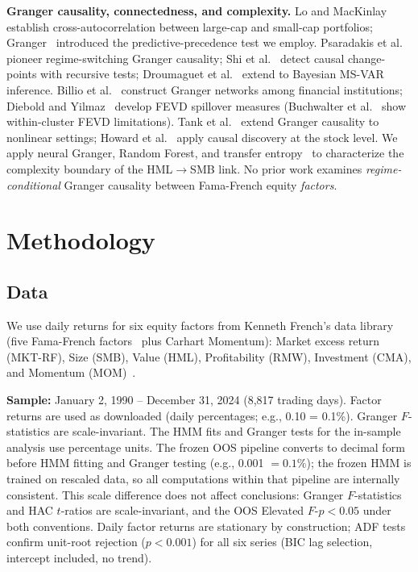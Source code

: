 \documentclass[sigconf,anonymous]{acmart}
\begin{document}
\textbf{Granger causality, connectedness, and complexity.}
Lo and MacKinlay~\cite{lo1990contrarian} establish cross-autocorrelation
between large-cap and small-cap portfolios; Granger~\cite{granger1969investigating}
introduced the predictive-precedence test we employ.
Psaradakis et al.~\cite{psaradakis2005markov} pioneer regime-switching Granger causality;
Shi et al.~\cite{shi2018change,shi2020causal} detect causal change-points with recursive tests;
Droumaguet et al.~\cite{droumaguet2017granger} extend to Bayesian MS-VAR inference.
Billio et al.~\cite{billio2012econometric} construct Granger networks among financial
institutions; Diebold and Yilmaz~\cite{diebold2012better} develop FEVD spillover measures
(Buchwalter et al.~\cite{buchwalter2025clustered} show within-cluster FEVD limitations).
Tank et al.~\cite{tank2022neural} extend Granger causality to nonlinear settings;
Howard et al.~\cite{howard2025causal} apply causal discovery at the stock level.
We apply neural Granger, Random Forest, and transfer
entropy~\cite{schreiber2000measuring,marschinski2002analysing,frenzel2007partial,barnett2009granger}
to characterize the complexity boundary of the HML$\to$SMB link.
No prior work examines \emph{regime-conditional} Granger causality
between Fama-French equity \emph{factors}.

\section{Methodology}

\subsection{Data}

We use daily returns for six equity factors from Kenneth French's data library~\cite{french2024data} (five Fama-French factors~\cite{fama2015five} plus Carhart Momentum):
Market excess return (MKT-RF), Size (SMB), Value (HML), Profitability (RMW),
Investment (CMA), and Momentum (MOM)~\cite{jegadeesh1993returns,carhart1997persistence}.

\textbf{Sample:} January 2, 1990 -- December 31, 2024 (8,817 trading days).
Factor returns are used as downloaded (daily percentages; e.g., 0.10 = 0.1\%).
Granger $F$-statistics are scale-invariant. The HMM fits and Granger tests for the
in-sample analysis use percentage units. The frozen OOS pipeline converts to decimal form
before HMM fitting and Granger testing (e.g., 0.001 $= 0.1\%$); the frozen HMM is trained
on rescaled data, so all computations within that pipeline are internally consistent.
This scale difference does not affect conclusions: Granger $F$-statistics and HAC $t$-ratios
are scale-invariant, and the OOS Elevated $F$-$p < 0.05$ under both conventions.
Daily factor returns are stationary by construction; ADF tests confirm unit-root
rejection ($p < 0.001$) for all six series (BIC lag selection, intercept included,
no trend).
\end{document}
